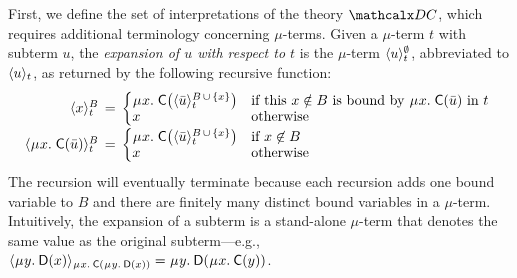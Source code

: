First, we define the set of interpretations of the theory $\thD$,
which requires additional terminology concerning $\mu$-terms.
Given a $\mu$-term $t$ with subterm $u$,
the \emph{expansion of $u$ with respect to $t$} is the $\mu$-term $\expand{t}{u}^\emptyset$,
abbreviated to
$\expand{t}{u}$, as returned by the following recursive function:
\[\begin{array}{r@{}c@{}l}
\expand{t}{x}^B & {} \,=\, {} &
\textstyle\relax{\begin{cases}
    \MU x.\; \const{C}\smash{\bigl( \expand{t}{ \vec u}^{\smash{B \,\cup\, \{ x \}}}\bigr)} & \text{if this $x \notin B$ is
    bound by $\MU x.\; \const{C}( \vec u )$ in $t$}  \\[-\jot]
    x & \text{otherwise}
\end{cases}} ~ \\
\expand{t}{\MU x.\; \const{C}( \vec u )}^B & = &
\textstyle\begin{cases}
    \MU x.\; \const{C}\smash{\bigl( \expand{t}{ \vec u }^{\smash{B \,\cup\, \{ x \}}}\bigr)} & \text{if }x \not\in B \\[-\jot]
    x & \text{otherwise}
\end{cases}
\end{array}\]
The recursion will eventually terminate because each recursion adds one bound
variable to $B$ and there are finitely many distinct bound variables in a $\mu$-term.
Intuitively, the expansion of a subterm is a stand-alone
$\mu$-term that denotes the same value as the original subterm---e.g.,
$\expand{\MU x.\: \const{C}(\MU y.\: \const{D}(x))}{\MU y.\: \const{D}(x)} =
 \MU y.\: \const{D}(\MU x.\: \const{C}(y))$.
%

